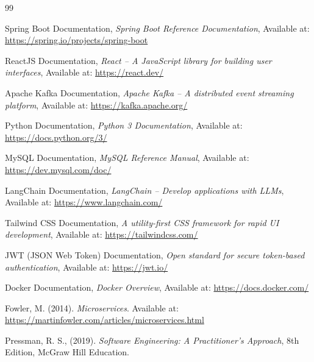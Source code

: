 \documentclass[12pt,a4paper]{report}
\begin{document}
\begin{thebibliography}{99}

Spring Boot Documentation, \textit{Spring Boot Reference Documentation},
Available at: \url{https://spring.io/projects/spring-boot}

ReactJS Documentation, \textit{React – A JavaScript library for building user interfaces}, 
Available at: \url{https://react.dev/}

Apache Kafka Documentation, \textit{Apache Kafka – A distributed event streaming platform}, 
Available at: \url{https://kafka.apache.org/}

Python Documentation, \textit{Python 3 Documentation}, 
Available at: \url{https://docs.python.org/3/}

MySQL Documentation, \textit{MySQL Reference Manual}, 
Available at: \url{https://dev.mysql.com/doc/}

LangChain Documentation, \textit{LangChain – Develop applications with LLMs}, 
Available at: \url{https://www.langchain.com/}

Tailwind CSS Documentation, \textit{A utility-first CSS framework for rapid UI development}, 
Available at: \url{https://tailwindcss.com/}

JWT (JSON Web Token) Documentation, \textit{Open standard for secure token-based authentication}, 
Available at: \url{https://jwt.io/}

Docker Documentation, \textit{Docker Overview}, 
Available at: \url{https://docs.docker.com/}

Fowler, M. (2014). \textit{Microservices}. 
Available at: \url{https://martinfowler.com/articles/microservices.html}

Pressman, R. S., (2019). \textit{Software Engineering: A Practitioner's Approach}, 8th Edition, McGraw Hill Education.

\end{thebibliography}
\end{document}
